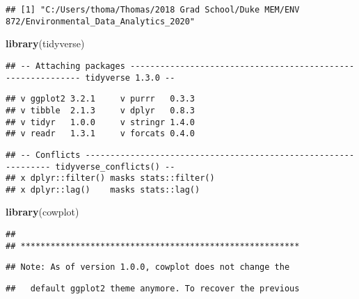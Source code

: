 \documentclass[
]{article}
\newenvironment{Shaded}{\begin{snugshade}}{\end{snugshade}}
\newcommand{\CommentTok}[1]{\textcolor[rgb]{0.56,0.35,0.01}{\textit{#1}}}
\newcommand{\KeywordTok}[1]{\textcolor[rgb]{0.13,0.29,0.53}{\textbf{#1}}}
\newcommand{\NormalTok}[1]{#1}
\begin{document}
\begin{Shaded}
\end{Shaded}

\begin{verbatim}
## [1] "C:/Users/thoma/Thomas/2018 Grad School/Duke MEM/ENV 872/Environmental_Data_Analytics_2020"
\end{verbatim}

\begin{Shaded}
\begin{Highlighting}[]
\KeywordTok{library}\NormalTok{(tidyverse)}
\end{Highlighting}
\end{Shaded}

\begin{verbatim}
## -- Attaching packages ------------------------------------------------------------ tidyverse 1.3.0 --
\end{verbatim}

\begin{verbatim}
## v ggplot2 3.2.1     v purrr   0.3.3
## v tibble  2.1.3     v dplyr   0.8.3
## v tidyr   1.0.0     v stringr 1.4.0
## v readr   1.3.1     v forcats 0.4.0
\end{verbatim}

\begin{verbatim}
## -- Conflicts --------------------------------------------------------------- tidyverse_conflicts() --
## x dplyr::filter() masks stats::filter()
## x dplyr::lag()    masks stats::lag()
\end{verbatim}

\begin{Shaded}
\begin{Highlighting}[]
\KeywordTok{library}\NormalTok{(cowplot)}
\end{Highlighting}
\end{Shaded}

\begin{verbatim}
## 
## ********************************************************
\end{verbatim}

\begin{verbatim}
## Note: As of version 1.0.0, cowplot does not change the
\end{verbatim}

\begin{verbatim}
##   default ggplot2 theme anymore. To recover the previous
\end{verbatim}
\end{document}
